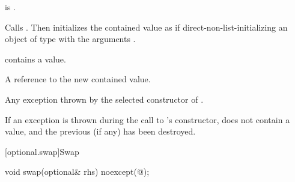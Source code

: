 \begin{itemdescr}
\pnum
\constraints
{} is .

\pnum
\effects
Calls . Then initializes the contained value as if direct-non-list-initializing an object of type  with the arguments .

\pnum
\ensures
{} contains a value.

\pnum
\returns
A reference to the new contained value.

\pnum
\throws
Any exception thrown by the selected constructor of .

\pnum
\remarks
If an exception is thrown during the call to 's constructor,  does not contain a value, and the previous  (if any) has been destroyed.
\end{itemdescr}

[optional.swap]{Swap}

%
\begin{itemdecl}
void swap(optional& rhs) noexcept(@\seebelow@);
\end{itemdecl}

